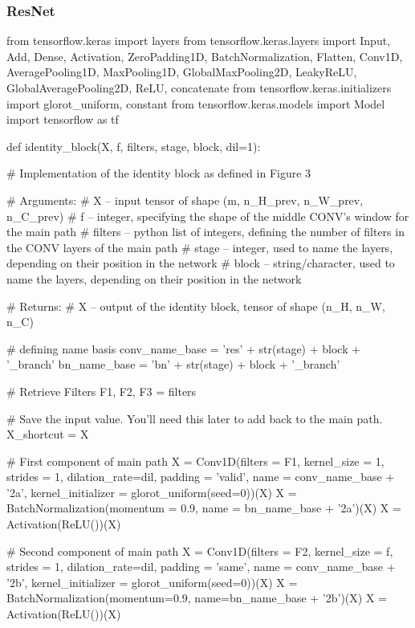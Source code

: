 \subsubsection*{ResNet}
\begin{python}
from tensorflow.keras import layers
from tensorflow.keras.layers import Input, Add, Dense, Activation, ZeroPadding1D, BatchNormalization, Flatten, Conv1D, AveragePooling1D, MaxPooling1D, GlobalMaxPooling2D, LeakyReLU, GlobalAveragePooling2D, ReLU, concatenate
from tensorflow.keras.initializers import glorot_uniform, constant
from tensorflow.keras.models import Model
import tensorflow as tf


def identity_block(X, f, filters, stage, block, dil=1):

    # Implementation of the identity block as defined in Figure 3
    
    # Arguments:
    # X -- input tensor of shape (m, n_H_prev, n_W_prev, n_C_prev)
    # f -- integer, specifying the shape of the middle CONV's window for the main path
    # filters -- python list of integers, defining the number of filters in the CONV layers of the main path
    # stage -- integer, used to name the layers, depending on their position in the network
    # block -- string/character, used to name the layers, depending on their position in the network
    
    #  Returns:
    # X -- output of the identity block, tensor of shape (n_H, n_W, n_C)
    
    # defining name basis
    conv_name_base = 'res' + str(stage) + block + '_branch'
    bn_name_base = 'bn' + str(stage) + block + '_branch'
    
    # Retrieve Filters
    F1, F2, F3 = filters
    
    # Save the input value. You'll need this later to add back to the main path. 
    X_shortcut = X
    
    # First component of main path
    X = Conv1D(filters = F1, kernel_size = 1, strides = 1, dilation_rate=dil, padding = 'valid', name = conv_name_base + '2a', kernel_initializer = glorot_uniform(seed=0))(X)
    X = BatchNormalization(momentum = 0.9, name = bn_name_base + '2a')(X)
    X = Activation(ReLU())(X)

    # Second component of main path
    X = Conv1D(filters = F2, kernel_size = f, strides = 1, dilation_rate=dil, padding = 'same', name = conv_name_base + '2b', kernel_initializer = glorot_uniform(seed=0))(X)
    X = BatchNormalization(momentum=0.9, name=bn_name_base + '2b')(X)
    X = Activation(ReLU())(X)


\end{python}
